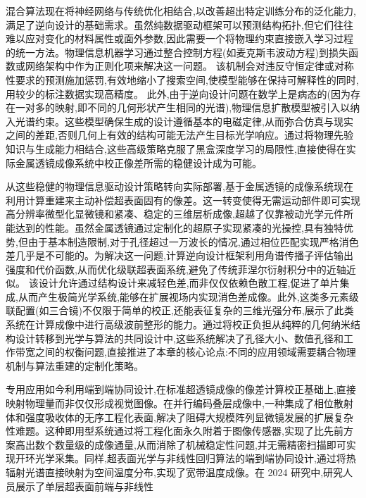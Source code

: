 混合算法现在将神经网络与传统优化相结合,以改善超出特定训练分布的泛化能力,满足了逆向设计的基础需求。虽然纯数据驱动框架可以预测结构拓扑,但它们往往难以应对变化的材料属性或面外参数,因此需要一个将物理约束直接嵌入学习过程的统一方法。物理信息机器学习通过整合控制方程(如麦克斯韦波动方程)到损失函数或网络架构中作为正则化项来解决这一问题。\citep{doi_10_21070_acopen_10_2025_12939_5a404b4e} \citep{doi_10_1109_tmtt_2026_3658422_94a01e71} 该机制会对违反守恒定律或对称性要求的预测施加惩罚,有效地缩小了搜索空间,使模型能够在保持可解释性的同时,用较少的标注数据实现高精度。\citep{doi_10_71465_fapm546_bda368a5} 此外,由于逆向设计问题在数学上是病态的(因为存在一对多的映射,即不同的几何形状产生相同的光谱),物理信息扩散模型被引入以纳入光谱约束。这些模型确保生成的设计遵循基本的电磁定律,从而弥合仿真与现实之间的差距,否则几何上有效的结构可能无法产生目标光学响应。通过将物理先验知识与生成能力相结合,这些高级策略克服了黑盒深度学习的局限性,直接使得在实际金属透镜成像系统中校正像差所需的稳健设计成为可能。\citep{doi_10_1002_adom_202100548_6789fa4c} \citep{doi_10_1002_adpr_202300158_66d61883} \citep{doi_10_71465_fapm546_bda368a5}

从这些稳健的物理信息驱动设计策略转向实际部署,基于金属透镜的成像系统现在利用计算重建来主动补偿超表面固有的像差。这一转变使得无需运动部件即可实现高分辨率微型化显微镜和紧凑、稳定的三维层析成像,超越了仅靠被动光学元件所能达到的性能。虽然金属透镜通过定制化的超原子实现紧凑的光操控,具有独特优势,但由于基本制造限制,对于孔径超过一万波长的情况,通过相位匹配实现严格消色差几乎是不可能的。为解决这一问题,计算逆向设计框架利用角谱传播子评估输出强度和代价函数,从而优化级联超表面系统,避免了传统菲涅尔衍射积分中的近轴近似。\citep{doi_10_1364_oe_448757_33bdf93c} \citep{doi_10_1002_lpor_202401011_3926c17d} 该设计允许通过结构设计来减轻色差,而非仅仅依赖色散工程,促进了单片集成,从而产生极简光学系统,能够在扩展视场内实现消色差成像。此外,这类多元素级联配置(如三合镜)不仅限于简单的校正,还能表征复杂的三维光强分布,展示了此类系统在计算成像中进行高级波前整形的能力。通过将校正负担从纯粹的几何纳米结构设计转移到光学与算法的共同设计中,这些系统解决了孔径大小、数值孔径和工作带宽之间的权衡问题,直接推进了本章的核心论点:不同的应用领域需要耦合物理机制与算法重建的定制化策略。\citep{doi_10_3788_pi_2023_c01_9f71817a} \citep{doi_10_1364_oe_27_030308_704a1c9b} \citep{doi_10_1038_s41377_026_02272_y_42e58df2}

专用应用如今利用端到端协同设计,在标准超透镜成像的像差计算校正基础上,直接映射物理量而非仅仅形成视觉图像。在并行编码叠层成像中,一种集成了相位散射体和强度吸收体的无序工程化表面,解决了阻碍大规模阵列显微镜发展的扩展复杂性难题。这种即用型系统通过将工程化面永久附着于图像传感器,实现了比先前方案高出数个数量级的成像通量,从而消除了机械稳定性问题,并无需精密扫描即可实现开环光学采集。同样,超表面光学与非线性回归算法的端到端协同设计,通过将热辐射光谱直接映射为空间温度分布,实现了宽带温度成像。在 2024 研究中,研究人员展示了单层超表面前端与非线性

